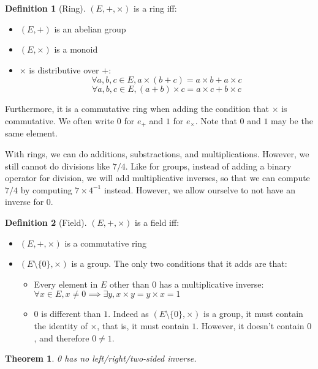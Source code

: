 \documentclass{article}
\newtheorem{theorem}{Theorem}[section]
\theoremstyle{definition}
\newtheorem{definition}{Definition}[section]
\theoremstyle{remark}
\theoremstyle{example}
\begin{document}
\begin{definition}[Ring] %
		$(E, +, \times)$ is a ring iff:
		\begin{itemize}
				\item $(E, +)$ is an abelian group
				\item $(E, \times)$ is a monoid
				\item $\times$ is distributive over $+$:
						$$\forall a, b, c \in E, a \times (b + c) = a \times b + a \times c$$
						$$\forall a, b, c \in E, (a + b) \times c = a \times c + b \times c$$
		\end{itemize}
		Furthermore, it is a commutative ring when adding the condition that $\times$ is commutative. We often write $0$ for $e_+$ and $1$ for $e_\times$. Note that $0$ and $1$ may be the same element.
\end{definition}

With rings, we can do additions, substractions, and multiplications. However, we still cannot do divisions like $7 / 4$. Like for groups, instead of adding a binary operator for division, we will add multiplicative inverses, so that we can compute $7 / 4$ by computing $7 \times 4^{-1}$ instead. However, we allow ourselve to not have an inverse for 0.


\begin{definition}[Field] %
		$(E, +, \times)$ is a field iff:
		\begin{itemize}
				\item $(E, +, \times)$ is a commutative ring
				\item $(E\setminus\{0\}, \times)$ is a group. The only two conditions that it adds are that:
				\begin{itemize}
						\item Every element in $E$ other than $0$ has a multiplicative inverse: $\forall x \in E, x \neq 0 \implies \exists y, x \times y = y \times x = 1$
						\item $0$ is different than $1$. Indeed as $(E\setminus\{0\}, \times)$ is a group, it must contain the identity of $\times$, that is, it must contain $1$. However, it doesn't contain $0$, and therefore $0 \neq 1$.
				\end{itemize}
		\end{itemize}
\end{definition}

\begin{theorem}
		0 has no left/right/two-sided inverse.
\end{theorem}
\end{document}
